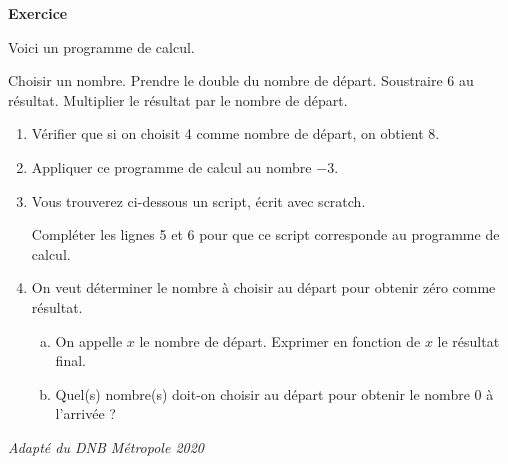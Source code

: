 \documentclass{article}
\def\adapte#1{
    \begin{flushright}
        \itshape\scriptsize Adapté du DNB #1
    \end{flushright}
}
\newcounter{exercice}
\def\newexercice{
    \newpage
    \stepcounter{exercice}
    \begin{flushleft}
        \Large\bfseries Exercice \arabic{exercice}
    \end{flushleft}
}
\begin{document}
\newexercice
    Voici un programme de calcul.
    \begin{center}
        \begin{minipage}{.65\linewidth}
            \begin{simplebox}
                Choisir un nombre.
                \vskip8pt
                Prendre le double du nombre de départ.
                \vskip8pt
                Soustraire 6 au résultat.
                \vskip8pt
                Multiplier le résultat par le nombre de départ.
            \end{simplebox}
        \end{minipage}
    \end{center}\vskip10pt
    \begin{enumerate}[1), font=\bfseries]
        \item Vérifier que si on choisit 4 comme nombre de départ, on obtient
            8.
        \item Appliquer ce programme de calcul au nombre $-3$.
        \item Vous trouverez ci-dessous un script, écrit avec scratch.
        \begin{center}
            \begin{scratch}[corner=1ex, num blocks=true]
            \end{scratch}
        \end{center}
        Compléter les lignes 5 et 6 pour que ce script corresponde au programme
        de calcul.
        \item On veut déterminer le nombre à choisir au départ pour obtenir zéro comme résultat.
        \begin{enumerate}[a), font=\bfseries]
            \item On appelle $x$ le nombre de départ. Exprimer en fonction de
            $x$ le résultat final.
            \item Quel(s) nombre(s) doit-on choisir au départ pour obtenir le
            nombre 0 à l'arrivée ?
        \end{enumerate}
    \end{enumerate}
    \adapte{Métropole 2020}
\end{document}
